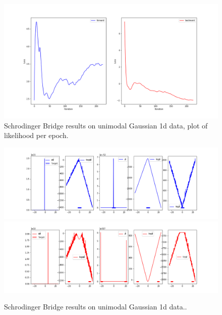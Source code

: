 \documentclass[a4paper,12pt,twoside,openright]{report}
\theoremstyle{definition}
\begin{document}
\begin{figure}
    \centering
    \includegraphics[scale=0.47,trim={4.3cm 1cm 2.5cm 0}, clip]{images/Pavon/pavon convergence big var.png} \vspace{-0.6cm}
    \caption{Schrodinger Bridge results on unimodal Gaussian 1d data, plot of likelihood per epoch. }
    \label{fig:small_to_big_convergence}
\end{figure}
\begin{figure}[t]
    \centering
    \includegraphics[scale=0.42,trim={4.3cm 0.2cm 1.5cm 0}, clip]{images/Pavon/Forward_unimodal_test_working_convex.png} \\\vspace{-0.2cm}
    \includegraphics[scale=0.42,trim={4.3cm 0 1.5cm 1.5cm}, clip]{images/Pavon/Backward_unimodal_test_working_convex.png} 
    \caption{Schrodinger Bridge results on unimodal Gaussian 1d data.. }
    \label{fig:small_delta_collapse}
\end{figure}
\end{document}

